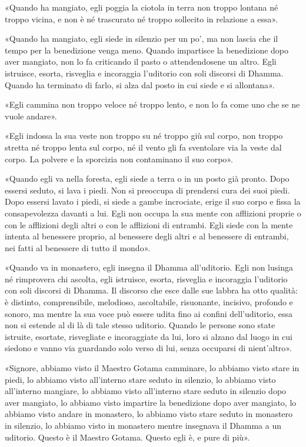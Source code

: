 «Quando ha mangiato, egli poggia la ciotola in terra non troppo lontana
né troppo vicina, e non è né trascurato né troppo sollecito in relazione
a essa».


«Quando ha mangiato, egli siede in silenzio per un po’, ma non lascia
che il tempo per la benedizione venga meno. Quando impartisce la
benedizione dopo aver mangiato, non lo fa criticando il pasto o
attendendosene un altro. Egli istruisce, esorta, risveglia e incoraggia
l’uditorio con soli discorsi di Dhamma. Quando ha terminato di farlo, si
alza dal posto in cui siede e si allontana».


«Egli cammina non troppo veloce né troppo lento, e non lo fa come uno
che se ne vuole andare».


«Egli indossa la sua veste non troppo su né troppo giù sul corpo, non
troppo stretta né troppo lenta sul corpo, né il vento gli fa sventolare
via la veste dal corpo. La polvere e la sporcizia non contaminano il suo
corpo».


«Quando egli va nella foresta, egli siede a terra o in un posto già
pronto. Dopo essersi seduto, si lava i piedi. Non si preoccupa di
prendersi cura dei suoi piedi. Dopo essersi lavato i piedi, si siede a
gambe incrociate, erige il suo corpo e fissa la consapevolezza davanti a
lui. Egli non occupa la sua mente con afflizioni proprie o con le
afflizioni degli altri o con le afflizioni di entrambi. Egli siede con
la mente intenta al benessere proprio, al benessere degli altri e al
benessere di entrambi, nei fatti al benessere di tutto il mondo».


«Quando va in monastero, egli insegna il Dhamma all’uditorio. Egli non
lusinga né rimprovera chi ascolta, egli istruisce, esorta, risveglia e
incoraggia l’uditorio con soli discorsi di Dhamma. Il discorso che esce
dalle sue labbra ha otto qualità: è distinto, comprensibile, melodioso,
ascoltabile, risuonante, incisivo, profondo e sonoro, ma mentre la sua
voce può essere udita fino ai confini dell’uditorio, essa non si estende
al di là di tale stesso uditorio. Quando le persone sono state istruite,
esortate, risvegliate e incoraggiate da lui, loro si alzano dal luogo in
cui siedono e vanno via guardando solo verso di lui, senza occuparsi di
nient’altro».


«Signore, abbiamo visto il Maestro Gotama camminare, lo abbiamo visto
stare in piedi, lo abbiamo visto all’interno stare seduto in silenzio,
lo abbiamo visto all’interno mangiare, lo abbiamo visto all’interno
stare seduto in silenzio dopo aver mangiato, lo abbiamo visto impartire
la benedizione dopo aver mangiato, lo abbiamo visto andare in monastero,
lo abbiamo visto stare seduto in monastero in silenzio, lo abbiamo visto
in monastero mentre insegnava il Dhamma a un uditorio. Questo è il
Maestro Gotama. Questo egli è, e pure di più».


